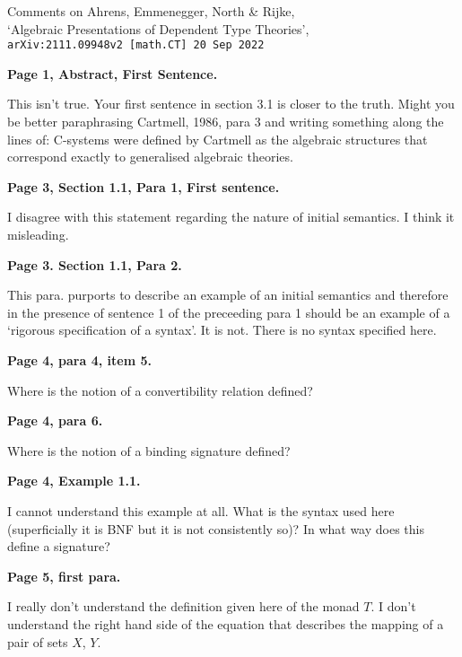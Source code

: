 \documentclass[10pt,a4paper]{scrartcl}
\newenvironment{comment}[1]
{\begin{framed}
\textbf{#1}
}
{
\end{framed}
}
\begin{document}
\noindent
{\Large
Comments on Ahrens, Emmenegger, North \& Rijke, \\
`Algebraic Presentations of Dependent Type Theories',\\
\verb'arXiv:2111.09948v2 [math.CT] 20 Sep 2022'
}
 \small
\begin{comment}{Page 1, Abstract, First Sentence.}
This isn't true. Your first sentence in section 3.1  is closer to the truth.
Might you  be better paraphrasing Cartmell, 1986, para 3 and writing something along the lines of:
C-systems were defined by Cartmell as the algebraic structures that correspond exactly to generalised algebraic theories. 
\end{comment}

\begin{comment}{Page 3, Section 1.1, Para 1, First sentence. }
I disagree with this statement regarding the nature of initial semantics. I think it misleading. 
\end{comment}

\begin{comment}{Page 3. Section 1.1, Para 2.}
This para. purports to describe an example of an initial semantics and therefore in the presence of sentence 1 of the preceeding para 1 should be an example of a `rigorous specification of a syntax'. It is not. There is no syntax specified here. 
\end{comment} 

\begin{comment}{Page 4, para 4, item 5.}
Where is the notion of a convertibility relation defined?
\end{comment}

\begin{comment}{Page 4, para 6.} 
Where is the notion of a binding signature defined?
\end{comment}

\begin{comment}{Page 4, Example 1.1.}
I cannot understand this example at all. What is the syntax used here (superficially it is BNF but it is not consistently so)? In what way does this define a signature?
\end{comment} 

\begin{comment}{Page 5, first para.}
I really don't understand the definition given here of the monad $T$. 
I don't understand the right hand side of the equation that describes the mapping of a pair of sets $X$, $Y$. 
\end{comment} 
\end{document}
